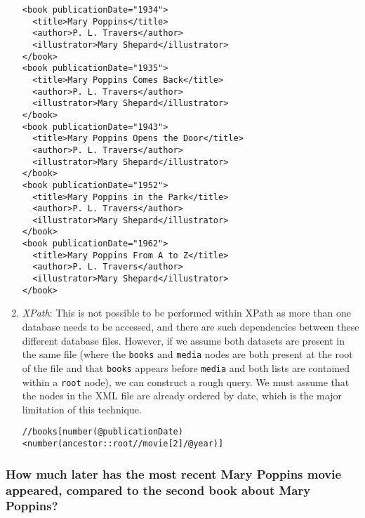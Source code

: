 \documentclass[11pt]{article}
\begin{document}
\begin{enumerate}
\begin{verbatim}
<book publicationDate="1934">
  <title>Mary Poppins</title>
  <author>P. L. Travers</author>
  <illustrator>Mary Shepard</illustrator>
</book>
<book publicationDate="1935">
  <title>Mary Poppins Comes Back</title>
  <author>P. L. Travers</author>
  <illustrator>Mary Shepard</illustrator>
</book>
<book publicationDate="1943">
  <title>Mary Poppins Opens the Door</title>
  <author>P. L. Travers</author>
  <illustrator>Mary Shepard</illustrator>
</book>
<book publicationDate="1952">
  <title>Mary Poppins in the Park</title>
  <author>P. L. Travers</author>
  <illustrator>Mary Shepard</illustrator>
</book>
<book publicationDate="1962">
  <title>Mary Poppins From A to Z</title>
  <author>P. L. Travers</author>
  <illustrator>Mary Shepard</illustrator>
</book>
\end{verbatim} 

\item \textit{XPath}: This is not possible to be performed within XPath as more than one database needs to be accessed, and there are such dependencies between these different database files. However, if we assume both datasets are present in the same file (where the \texttt{books} and \texttt{media} nodes are both present at the root of the file and that \texttt{books} appears before \texttt{media} and both lists are contained within a \texttt{root} node), we can construct a rough query. We must assume that the nodes in the XML file are already ordered by date, which is the major limitation of this technique.
\begin{verbatim}
//books[number(@publicationDate)<number(ancestor::root//movie[2]/@year)]
\end{verbatim}
\end{enumerate}

\subsubsection{How much later has the most recent Mary Poppins movie appeared, compared to the second book about Mary Poppins?}
\end{document}
